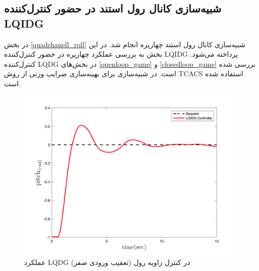 \subsection{شبیه‌سازی کانال رول استند در حضور کنترل‌کننده LQIDG}\label{roll_lqidg_section}
در بخش
\ref{quadchanell_roll}
شبیه‌سازی کانال رول استند چهارپره انجام شد. در این بخش به بررسی عملکرد چهارپره در حضور کنترل‌کننده LQIDG پرداخته می‌شود. کنترل‌کننده LQDG در بخش‌های
\ref{openloop_game}
و
\ref{closedloop_game}
بررسی شده است.
 در شبیه‌سازی برای بهینه‌سازی ضرایب وزنی از روش
TCACS \cite{Karimi2010}
استفاده شده است.
\begin{figure}[H]
	\includegraphics[width=12cm]{../Figures/Calibration/LQIDG/Pitch/lqidg_pitch.png}
	\centering
	\caption{عملكرد LQDG در کنترل زاويه رول (تعقیب ورودی صفر)}
\end{figure}

